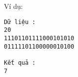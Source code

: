 Ví dụ:
\begin{verbatim}
Dữ liệu :
20
11101101111000101010
01111101100000010100

Kết quả :
7
\end{verbatim}